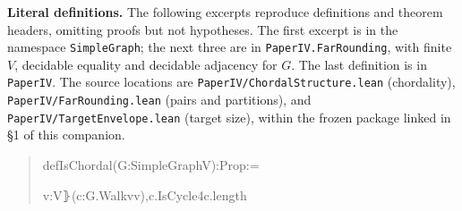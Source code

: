 \documentclass[english,11pt,a4paper]{article}
\newlength{\LeanCharWidth}
\begin{document}
\textbf{Literal definitions.} The following excerpts reproduce
definitions and theorem headers, omitting proofs but not hypotheses. The
first excerpt is in the namespace \nolinkurl{SimpleGraph}; the next three
are in \nolinkurl{PaperIV.FarRounding}, with finite \(V\), decidable
equality and decidable adjacency for \(G\). The last definition is in
\nolinkurl{PaperIV}. The source locations are
\nolinkurl{PaperIV/ChordalStructure.lean} (chordality),
\nolinkurl{PaperIV/FarRounding.lean} (pairs and partitions), and
\nolinkurl{PaperIV/TargetEnvelope.lean} (target size), within the frozen
package linked in §1 of this companion.

\begin{quote}\fontsize{8.5}{10.2}\selectfont\ttfamily\raggedright\setlength{\parskip}{0pt}\settowidth{\LeanCharWidth}{0}
\noindent def\hspace*{\dimexpr 1\LeanCharWidth\relax}IsChordal\hspace*{\dimexpr 1\LeanCharWidth\relax}(G\hspace*{\dimexpr 1\LeanCharWidth\relax}:\hspace*{\dimexpr 1\LeanCharWidth\relax}SimpleGraph\hspace*{\dimexpr 1\LeanCharWidth\relax}V)\hspace*{\dimexpr 1\LeanCharWidth\relax}:\hspace*{\dimexpr 1\LeanCharWidth\relax}Prop\hspace*{\dimexpr 1\LeanCharWidth\relax}:=\par
\noindent \hspace*{\dimexpr 2\LeanCharWidth\relax}{\LeanSymbols ∀}\hspace*{\dimexpr 1\LeanCharWidth\relax}{\LeanSymbols ⦃}v\hspace*{\dimexpr 1\LeanCharWidth\relax}:\hspace*{\dimexpr 1\LeanCharWidth\relax}V{\LeanSymbols ⦄}\hspace*{\dimexpr 1\LeanCharWidth\relax}(c\hspace*{\dimexpr 1\LeanCharWidth\relax}:\hspace*{\dimexpr 1\LeanCharWidth\relax}G.Walk\hspace*{\dimexpr 1\LeanCharWidth\relax}v\hspace*{\dimexpr 1\LeanCharWidth\relax}v),\hspace*{\dimexpr 1\LeanCharWidth\relax}c.IsCycle\hspace*{\dimexpr 1\LeanCharWidth\relax}{\LeanSymbols →}\hspace*{\dimexpr 1\LeanCharWidth\relax}4\hspace*{\dimexpr 1\LeanCharWidth\relax}{\LeanSymbols ≤}\hspace*{\dimexpr 1\LeanCharWidth\relax}c.length\hspace*{\dimexpr 1\LeanCharWidth\relax}{\LeanSymbols →}\par

\end{quote}
\end{document}

